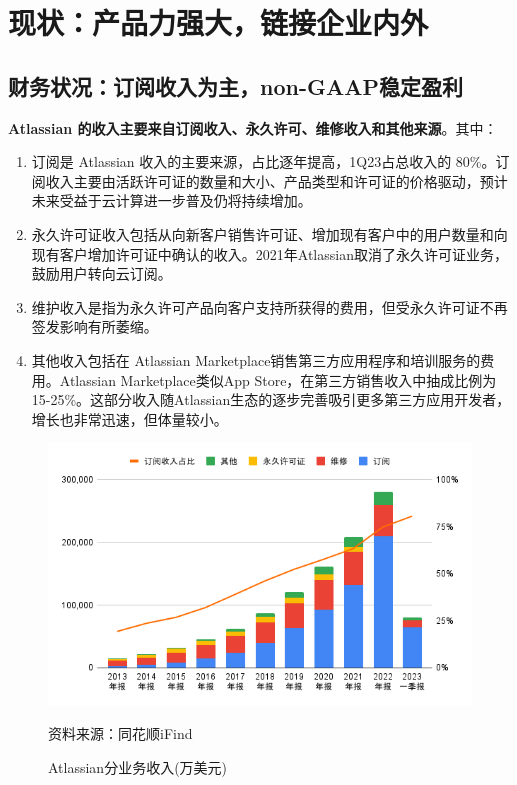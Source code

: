 \section{现状：产品力强大，链接企业内外}

\subsection{财务状况：订阅收入为主，non-GAAP稳定盈利}

\textbf{Atlassian 的收入主要来自订阅收入、永久许可、维修收入和其他来源}。其中：
\begin{enumerate}
    \item 订阅是 Atlassian 收入的主要来源，占比逐年提高，1Q23占总收入的 80\%。订阅收入主要由活跃许可证的数量和大小、产品类型和许可证的价格驱动，预计未来受益于云计算进一步普及仍将持续增加。
    \item 永久许可证收入包括从向新客户销售许可证、增加现有客户中的用户数量和向现有客户增加许可证中确认的收入。2021年Atlassian取消了永久许可证业务，鼓励用户转向云订阅。
    \item 维护收入是指为永久许可产品向客户支持所获得的费用，但受永久许可证不再签发影响有所萎缩。
    \item 其他收入包括在 Atlassian Marketplace销售第三方应用程序和培训服务的费用。Atlassian Marketplace类似App Store，在第三方销售收入中抽成比例为15-25\%。这部分收入随Atlassian生态的逐步完善吸引更多第三方应用开发者，增长也非常迅速，但体量较小。
\end{enumerate}
\begin{figure}[H]
    \caption{Atlassian分业务收入(万美元)}
    \begin{center}
        \includegraphics[width=\linewidth]{img/revenue.png}
    \end{center}
    \footnotesize{资料来源：同花顺iFind}
\end{figure}

